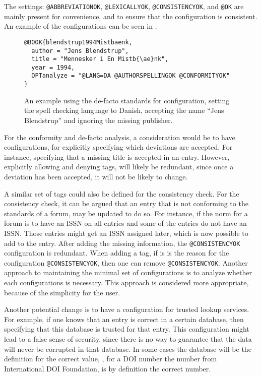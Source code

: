 The settings: \texttt{@ABBREVIATIONOK}, \texttt{@LEXICALLYOK},
\texttt{@CONSISTENCYOK}, and \texttt{@OK} are mainly present for
convenience, and to ensure that the configuration is consistent.  An
example of the configurations can be seen in
.

\begin{figure}
  \centering
\begin{verbatim}
@BOOK{blendstrup1994Mistbaenk,
  author = "Jens Blendstrup",
  title = "Mennesker i En Mistb{\ae}nk",
  year = 1994,
  OPTanalyze = "@LANG=DA @AUTHORSPELLINGOK @CONFORMITYOK"
}
\end{verbatim}
  \caption{An example using the de-facto standards for configuration,
    setting the spell checking language to Danish, accepting the name
    ``Jens Blendstrup'' and ignoring the missing publisher.}
  \label{fig:analyzing_added_de_facto_standards}
\end{figure}


For the conformity and de-facto analysis, a consideration would be to
have configurations, for explicitly specifying which deviations are
accepted.  For instance, specifying that a missing title is accepted
in an entry.  However, explicitly allowing and denying tags, will
likely be redundant, since once a deviation has been accepted, it will
not be likely to change.

A similar set of tags could also be defined for the consistency check.
For the consistency check, it can be argued that an entry that is not
conforming to the standards of a forum, may be updated to do so.  For
instance, if the norm for a forum is to have an ISSN on all entries
and some of the entries do not have an ISSN.  Those entries might get
an ISSN assigned later, which is now possible to add to the entry.
After adding the missing information, the \texttt{@CONSISTENCYOK}
configuration is redundant.  When adding a tag, if is is the reason
for the configuration \texttt{@CONSISTENCYOK}, then one can remove
\texttt{@CONSISTENCYOK}.  Another approach to maintaining the minimal
set of configurations is to analyze whether each configurations is
necessary.  This approach is considered more appropriate, because of
the simplicity for the user.

Another potential change is to have a configuration for trusted
lookup services.  For example, if one knows that an entry is correct
in a certain database, then specifying that this database is trusted
for that entry.  This configuration might lead to a false sense of
security, since there is no way to guarantee that the data will never
be corrupted in that database.  In some cases the database will be the
definition for the correct value, \eg, for a DOI number the number
from International DOI Foundation, is by definition the correct
number.

